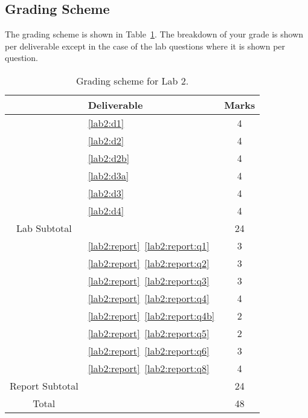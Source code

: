 \subsection{Grading Scheme}
The grading scheme is shown in Table~\ref{tab:lab2:grading}. The breakdown of
your grade is shown per deliverable except in the case of the lab
questions where it is shown per question.
%
\begin{table}
\centering
\caption[Grading Scheme for Lab 2]{Grading scheme for Lab 2.}
\label{tab:lab2:grading}
\begin{tabular}{c|l|c}
        & Deliverable           & Marks  \\ \hline
        & \ref{lab2:d1}         & 4       \\ \hline
        & \ref{lab2:d2}         & 4       \\ \hline
        & \ref{lab2:d2b}        & 4       \\ \hline
        & \ref{lab2:d3a}        & 4       \\ \hline
        & \ref{lab2:d3}         & 4       \\ \hline
        & \ref{lab2:d4}         & 4       \\ \hhline{=|=|=}
Lab Subtotal&                       & 24      \\ \hhline{=|=|=}
        & \ref{lab2:report}~\ref{lab2:report:q1}  & 3       \\ \hline
        & \ref{lab2:report}~\ref{lab2:report:q2}  & 3       \\ \hline
        & \ref{lab2:report}~\ref{lab2:report:q3}  & 3       \\ \hline
        & \ref{lab2:report}~\ref{lab2:report:q4}  & 4       \\ \hline
        & \ref{lab2:report}~\ref{lab2:report:q4b} & 2       \\ \hline
        & \ref{lab2:report}~\ref{lab2:report:q5}  & 2      \\ \hline
        & \ref{lab2:report}~\ref{lab2:report:q6}  & 3      \\ \hline
        & \ref{lab2:report}~\ref{lab2:report:q8}  & 4       \\ \hhline{=|=|=}
Report Subtotal&  & 24 \\ \hhline{=|=|=}
  Total &                       & 48
\end{tabular}
\end{table}
%
